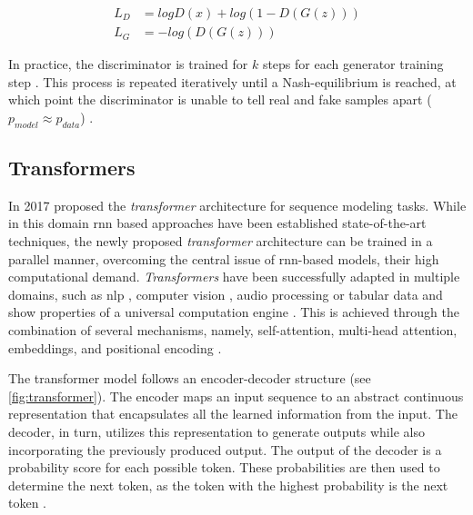 \begin{equation}
  \begin{align}
  \label{eqn:gan-loss}
  L_D&=logD(x)+log(1-D(G(z)))\\
  L_G&=-log(D(G(z)))
\end{align}
\end{equation}


In practice, the discriminator is trained for $k$ steps for each generator training step \cite{aggarwal2018NeuralNetworksDeep}.
This process is repeated iteratively until a Nash-equilibrium is reached, at which point the discriminator is unable to tell real and fake samples apart ($p_{model}\approx p_{data}$) \cite{NIPS2014_5ca3e9b1, aggarwal2018NeuralNetworksDeep}.

\subsection{Transformers}
\label{ch:preliminaries-transformers}

In 2017 \textcite{vaswani2017AttentionAllYou} proposed the \textit{transformer} architecture for sequence modeling tasks.
While in this domain \gls{rnn} based approaches have been established state-of-the-art techniques, the newly proposed \textit{transformer} architecture can be trained in a parallel manner,
overcoming the central issue of \gls{rnn}-based models, their high computational demand.
\textit{Transformers} have been successfully adapted in multiple domains, such as \gls{nlp} \cite{gillioz2020OverviewTransformerbasedModels}, computer vision \cite{khan2022TransformersVisionSurvey}, audio processing \cite{gong2022SSASTSelfSupervisedAudio} or 
tabular data \cite{huang2020TabTransformerTabularData} and show properties of a universal computation engine \cite{lu2021PretrainedTransformersUniversal, lin2022SurveyTransformers}.
This is achieved through the combination of several mechanisms, namely, self-attention, multi-head attention, embeddings, and positional encoding \cite{vaswani2017AttentionAllYou}.

The transformer model follows an encoder-decoder structure (see \autoref{fig:transformer}).
The encoder maps an input sequence to an abstract continuous representation that encapsulates all the learned information from the input.
The decoder, in turn, utilizes this representation to generate outputs while also incorporating the previously produced output.
The output of the decoder is a probability score for each possible token.
These probabilities are then used to determine the next token, as the token with the highest probability is the next token \cite{vaswani2017AttentionAllYou}. 

